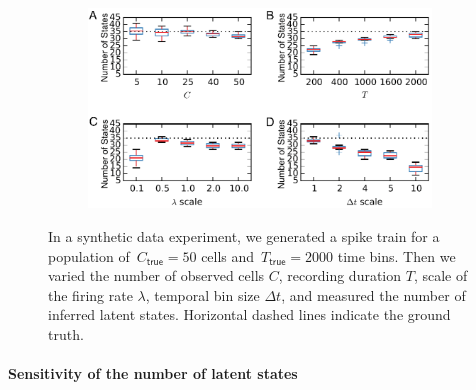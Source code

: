 \begin{figure}  
  \centering
  \begin{subfigure}[t]{5in}
    \includegraphics[width=\textwidth]{figures/ch5/Fig3}
  \end{subfigure}
  \caption[Inferred parameters of the HDP-HMM for synthetic data]{In a
    synthetic data experiment, we generated a spike train for a
    population of~$C_{\textsf{true}}=50$ cells
    and~$T_{\textsf{true}}=2000$ time bins. Then we varied the number
    of observed cells $C$, recording duration $T$, scale of the firing
    rate $\lambda$, temporal bin size $\Delta t$, and measured the
    number of inferred latent states. Horizontal dashed lines indicate
    the ground truth.}
  \label{fig3}
\end{figure}


\paragraph{Sensitivity of the number of latent states} 



